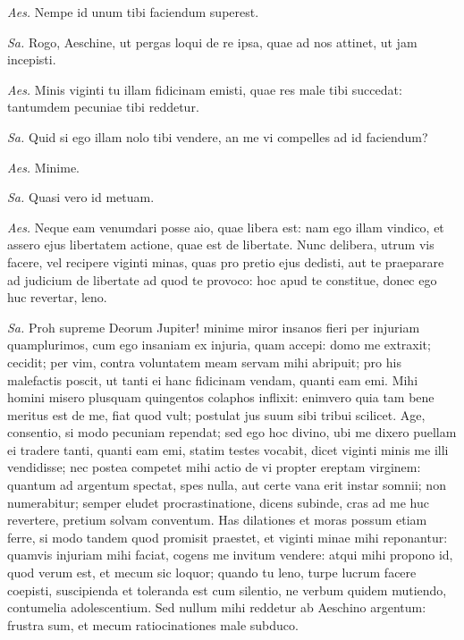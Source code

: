 {\textit{Aes.} Nempe id unum tibi faciendum superest. 

\textit{Sa.} Rogo, Aeschine, ut pergas loqui de re ipsa, quae ad nos attinet, ut jam incepisti. 

\textit{Aes.} Minis viginti tu illam fidicinam emisti, quae res male tibi succedat: tantumdem pecuniae tibi reddetur. 

\textit{Sa.} Quid si ego illam nolo tibi vendere, an me vi compelles ad id faciendum?

\textit{Aes.} Minime. 

\textit{Sa.} Quasi vero id metuam. 

\textit{Aes.} Neque eam venumdari posse aio, quae libera est: nam ego illam vindico, et assero ejus libertatem actione, quae est de libertate. Nunc delibera, utrum vis facere, vel recipere viginti minas, quas pro pretio ejus dedisti, aut te praeparare ad judicium de libertate ad quod te provoco: hoc apud te constitue, donec ego huc revertar, leno. 

\textit{Sa.} Proh supreme Deorum Jupiter! minime miror insanos fieri per injuriam quamplurimos, cum ego insaniam ex injuria, quam accepi: domo me extraxit; cecidit; per vim, contra voluntatem meam servam mihi abripuit; pro his malefactis poscit, ut tanti ei hanc fidicinam vendam, quanti eam emi. Mihi homini misero plusquam quingentos colaphos inflixit: enimvero quia tam bene meritus est de me, fiat quod vult; postulat jus suum sibi tribui scilicet. Age, consentio, si modo pecuniam rependat; sed ego hoc divino, ubi me dixero puellam ei tradere tanti, quanti eam emi, statim testes vocabit, dicet viginti minis me illi vendidisse; nec postea competet mihi actio de vi propter ereptam virginem: quantum ad argentum spectat, spes nulla, aut certe vana erit instar somnii; non numerabitur; semper eludet procrastinatione, dicens subinde, cras ad me huc revertere, pretium solvam conventum. Has dilationes et moras possum etiam ferre, si modo tandem quod promisit praestet, et viginti minae mihi reponantur: quamvis injuriam mihi faciat, cogens me invitum vendere: atqui mihi propono id, quod verum est, et mecum sic loquor; quando tu leno, turpe lucrum facere coepisti, suscipienda et toleranda est cum silentio, ne verbum quidem mutiendo, contumelia adolescentium. Sed nullum mihi reddetur ab Aeschino argentum: frustra sum, et mecum ratiocinationes male subduco.

}
